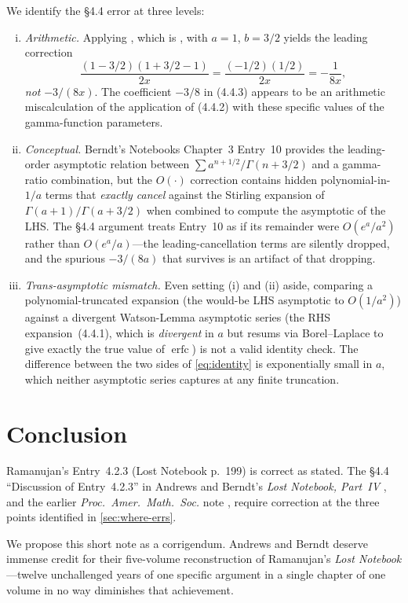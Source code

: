 \documentclass[11pt,reqno]{amsart}
\theoremstyle{definition}
\DeclareMathOperator{\erfc}{erfc}
\begin{document}
We identify the \S4.4 error at three levels:

\begin{enumerate}[(i)]
\item \emph{Arithmetic.} Applying
\cite[p.~116, eq.~(4.4.2)]{AB2013}, which is
\cite[6.147]{AbramowitzStegun}, with $a = 1$, $b = 3/2$ yields the
leading correction
\[
\frac{(1 - 3/2)(1 + 3/2 - 1)}{2x} = \frac{(-1/2)(1/2)}{2x} = -\frac{1}{8x},
\]
\emph{not} $-3/(8x)$. The coefficient $-3/8$ in (4.4.3) appears to be
an arithmetic miscalculation of the application of (4.4.2) with these
specific values of the gamma-function parameters.
\item \emph{Conceptual.} Berndt's Notebooks Chapter~3 Entry~10 provides
the leading-order asymptotic relation between
$\sum a^{n+1/2}/\Gamma(n+3/2)$ and a gamma-ratio combination, but the
$O(\cdot)$ correction contains hidden polynomial-in-$1/a$ terms that
\emph{exactly cancel} against the Stirling expansion of
$\Gamma(a+1)/\Gamma(a+3/2)$ when combined to compute the asymptotic
of the LHS. The \S4.4 argument treats Entry~10 as if its remainder
were $O(e^a/a^2)$ rather than $O(e^a/a)$---the leading-cancellation
terms are silently dropped, and the spurious $-3/(8a)$ that survives
is an artifact of that dropping.
\item \emph{Trans-asymptotic mismatch.} Even setting (i) and (ii) aside,
comparing a polynomial-truncated expansion (the would-be LHS
asymptotic to $O(1/a^2)$) against a divergent Watson-Lemma asymptotic
series (the RHS expansion~(4.4.1), which is \emph{divergent} in $a$
but resums via Borel--Laplace to give exactly the true value of
$\erfc$) is not a valid identity check. The difference between the
two sides of \cref{eq:identity} is exponentially small in $a$, which
neither asymptotic series captures at any finite truncation.
\end{enumerate}

\section{Conclusion}

Ramanujan's Entry~4.2.3 (Lost Notebook p.~199) is correct as stated.
The \S4.4 ``Discussion of Entry~4.2.3'' in Andrews and Berndt's
\emph{Lost Notebook, Part~IV} \cite{AB2013}, and the earlier
\emph{Proc.\ Amer.\ Math.\ Soc.} note \cite{Berndt2004}, require
correction at the three points identified in \cref{sec:where-errs}.

We propose this short note as a corrigendum. Andrews and Berndt
deserve immense credit for their five-volume reconstruction of
Ramanujan's \emph{Lost Notebook}---twelve unchallenged years of one
specific argument in a single chapter of one volume in no way
diminishes that achievement.
\end{document}
